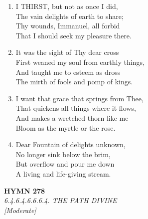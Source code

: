 \begin{enumerate}
    \item I THIRST, but not as once I did, \\
        The vain delights of earth to share; \\
        Thy wounds, Immanuel, all forbid \\
        That I should seek my pleasure there.

    \item It was the sight of Thy dear cross \\
        First weaned my soul from earthly things, \\
        And taught me to esteem as dross \\
        The mirth of fools and pomp of kings.

    \item I want that grace that springs from Thee, \\
        That quickens all things where it flows, \\
        And makes a wretched thorn like me \\
        Bloom as the myrtle or the rose.

    \item Dear Fountain of delights unknown, \\
        No longer sink below the brim, \\
        But overflow and pour me down \\
        A living and life-giving stream.

\end{enumerate}

\newpage
\begin{center}
    {\Large \textbf{HYMN 278}}
    \\
    \textit{6.4.6.4.6.6.6.4. THE PATH DIVINE}
    \\
    \textit{\small [Moderate]}
\end{center}
\vspace{1em}

